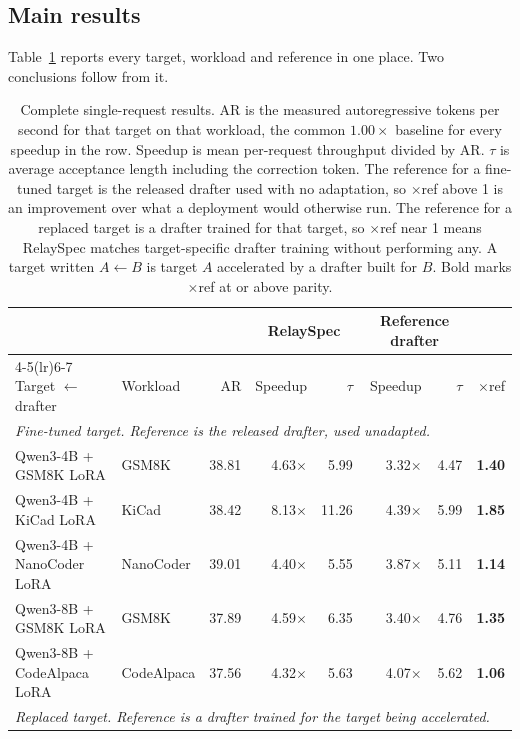 \subsection{Main results}
\label{sec:main-results}
Table~\ref{tab:main} reports every target, workload and reference in one place. Two conclusions follow from it.

\begin{table}[t]
\centering
\caption{Complete single-request results. AR is the measured autoregressive tokens per second for that target on that workload, the common $1.00\times$ baseline for every speedup in the row. Speedup is mean per-request throughput divided by AR. $\tau$ is average acceptance length including the correction token. The reference for a fine-tuned target is the released drafter used with no adaptation, so $\times$ref above 1 is an improvement over what a deployment would otherwise run. The reference for a replaced target is a drafter trained for that target, so $\times$ref near 1 means RelaySpec matches target-specific drafter training without performing any. A target written $A\leftarrow B$ is target $A$ accelerated by a drafter built for $B$. Bold marks $\times$ref at or above parity.}
\label{tab:main}
\small
\setlength{\tabcolsep}{4.2pt}
\begin{tabular}{llrrrrrr}
\toprule
& & & \multicolumn{2}{c}{RelaySpec} & \multicolumn{2}{c}{Reference drafter} & \\
\cmidrule(lr){4-5}\cmidrule(lr){6-7}
Target $\leftarrow$ drafter & Workload & AR & Speedup & $\tau$ & Speedup & $\tau$ & $\times$ref \\
\midrule
\multicolumn{8}{l}{\emph{Fine-tuned target. Reference is the released drafter, used unadapted.}} \\
Qwen3-4B + GSM8K LoRA & GSM8K & 38.81 & 4.63$\times$ & 5.99 & 3.32$\times$ & 4.47 & \textbf{1.40} \\
Qwen3-4B + KiCad LoRA & KiCad & 38.42 & 8.13$\times$ & 11.26 & 4.39$\times$ & 5.99 & \textbf{1.85} \\
Qwen3-4B + NanoCoder LoRA & NanoCoder & 39.01 & 4.40$\times$ & 5.55 & 3.87$\times$ & 5.11 & \textbf{1.14} \\
Qwen3-8B + GSM8K LoRA & GSM8K & 37.89 & 4.59$\times$ & 6.35 & 3.40$\times$ & 4.76 & \textbf{1.35} \\
Qwen3-8B + CodeAlpaca LoRA & CodeAlpaca & 37.56 & 4.32$\times$ & 5.63 & 4.07$\times$ & 5.62 & \textbf{1.06} \\
\midrule
\multicolumn{8}{l}{\emph{Replaced target. Reference is a drafter trained for the target being accelerated.}} \\

\end{tabular}
\end{table}
